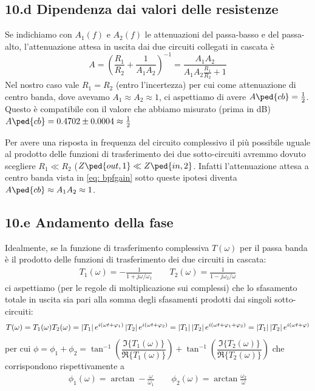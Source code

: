 \documentclass[10pt,a4paper]{article}
\begin{document}
\subsection*{10.d Dipendenza dai valori delle resistenze}
Se indichiamo con $A_1(f)$ e $A_2(f)$ le attenuazioni del passa-basso e del
passa-alto, l'attenuazione attesa in uscita dai due circuiti collegati in
cascata è
\begin{equation}\label{eq: bpfgain}
A = \left(\frac{R_1}{R_2} + \frac{1}{A_1 A_2}\right)^{-1} = 
\frac{A_1 A_2}{A_1 A_2 \frac{R_1}{R_2} + 1} 
\end{equation}
Nel nostro caso vale $R_1 = R_2$ (entro l'incertezza) per cui come
attenuazione di centro banda, dove avevamo $A_1 \approx A_2 \approx 1$, ci
aspettiamo di avere $A\ped{cb} = \frac{1}{2}$.
Questo è compatibile con il valore che abbiamo misurato (prima in dB)
$A\ped{cb} = 0.4702 \pm 0.0004 \approx \frac{1}{2}$

Per avere una risposta in frequenza del circuito complessivo il più possibile
uguale al prodotto delle funzioni di trasferimento dei due sotto-circuiti
avremmo dovuto scegliere $R_1 \ll R_2$ ($Z\ped{out, 1} \ll Z\ped{in, 2}$.
Infatti l'attenuazione attesa a centro banda vista in \eqref{eq: bpfgain}
sotto queste ipotesi diventa $A\ped{cb} \approx A_1 A_2 \approx 1$.
\subsection*{10.e Andamento della fase}
Idealmente, se la funzione di trasferimento complessiva $T(\omega)$ per il
passa banda è il prodotto delle funzioni di trasferimento dei due circuiti in
cascata:
\begin{align*}
T_1(\omega) = -\frac{1}{1 + j \omega/\omega_1} \qquad
T_2(\omega) = \frac{1}{1 - j \omega_2/\omega}
\end{align*}
ci aspettiamo (per le regole di moltiplicazione sui complessi) che lo
sfasamento totale in uscita sia pari alla somma degli sfasamenti prodotti dai
singoli sotto-circuiti:
\[
T(\omega) = T_1(\omega) T_2(\omega) =
\left| T_1 \right| e^{i (\omega t + \varphi_1)} \left| T_2 \right| e^{i (\omega t + \varphi_2)} =
\left| T_1 \right| \left| T_2 \right| e^{i (\omega t + \varphi_1 + \varphi_2)} =
\left| T_1 \right| \left| T_2 \right| e^{i (\omega t + \varphi)}
\]
per cui $\phi = \phi_1 + \phi_2 =
\tan^{-1} \left( \dfrac{\Im{\{T_1(\omega)\}}}{\Re{\{T_1(\omega)\}}} \right) +
\tan^{-1} \left( \dfrac{\Im{\{T_2(\omega)\}}}{\Re{\{T_2(\omega)\}}} \right)$
che corrispondono rispettivamente a
\begin{align*}
\phi_1(\omega) = \arctan - \frac{\omega}{\omega_1} \qquad
\phi_2(\omega) = \arctan \frac{\omega_2}{\omega}
\end{align*}
\end{document}
